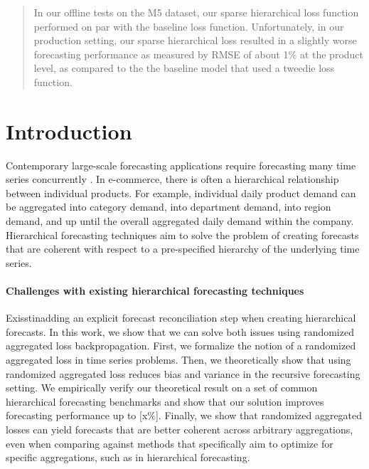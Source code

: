 \documentclass{article}
\begin{document}
\begin{abstract}
  In our offline tests on the M5 dataset, our sparse hierarchical loss function performed on par with the baseline loss function. Unfortunately, in our production setting, our sparse hierarchical loss resulted in a slightly worse forecasting performance as measured by RMSE of about 1\% at the product level, as compared to the the baseline model that used a tweedie loss function. 
\end{abstract}


\section{Introduction}
  Contemporary large-scale forecasting applications require forecasting many time series concurrently \cite{bose_probabilistic_2017}. In e-commerce, there is often a hierarchical relationship between individual products. For example, individual daily product demand can be aggregated into category demand, into department demand, into region demand, and up until the overall aggregated daily demand within the company. Hierarchical forecasting techniques \cite{hyndman_optimal_2011} aim to solve the problem of creating forecasts that are coherent with respect to a pre-specified hierarchy of the underlying time series.  
  
  \paragraph{Challenges with existing hierarchical forecasting techniques} Exisstinadding an explicit forecast reconciliation step when creating hierarchical forecasts. In this work, we show that we can solve both issues using randomized aggregated loss backpropagation. First, we formalize the notion of a randomized aggregated loss in time series problems. Then, we theoretically show that using randomized aggregated loss reduces bias and variance in the recursive forecasting setting. We empirically verify our theoretical result on a set of common hierarchical forecasting benchmarks and show that our solution improves forecasting performance up to [x\%]. Finally, we show that randomized aggregated losses can yield forecasts that are better coherent across arbitrary aggregations, even when comparing against methods that specifically aim to optimize for specific aggregations, such as in hierarchical forecasting. 
   
\end{document}
